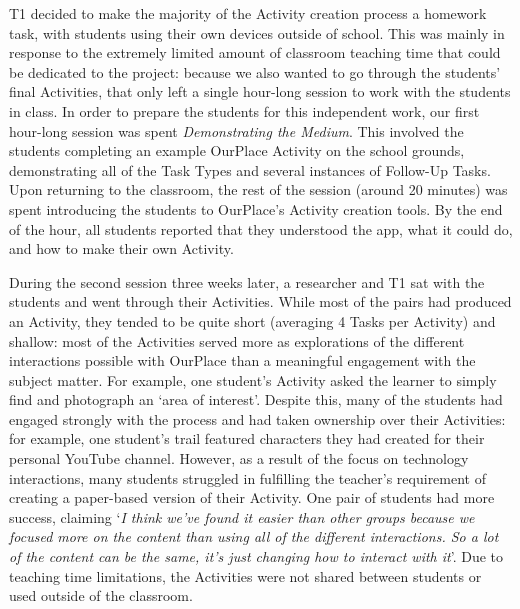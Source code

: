 T1 decided to make the majority of the Activity creation process a homework task, with students using their own devices outside of school. This was mainly in response to the extremely limited amount of classroom teaching time that could be dedicated to the project: because we also wanted to go through the students' final Activities, that only left a single hour-long session to work with the students in class. In order to prepare the students for this independent work, our first hour-long session was spent \textit{Demonstrating the Medium}. This involved the students completing an example OurPlace Activity on the school grounds, demonstrating all of the Task Types and several instances of Follow-Up Tasks. Upon returning to the classroom, the rest of the session (around 20 minutes) was spent introducing the students to OurPlace's Activity creation tools. By the end of the hour, all students reported that they understood the app, what it could do, and how to make their own Activity.

During the second session three weeks later, a researcher and T1 sat with the students and went through their Activities. While most of the pairs had produced an Activity, they tended to be quite short (averaging 4 Tasks per Activity) and shallow: most of the Activities served more as explorations of the different interactions possible with OurPlace than a meaningful engagement with the subject matter. For example, one student's Activity asked the learner to simply find and photograph an `area of interest'. Despite this, many of the students had engaged strongly with the process and had taken ownership over their Activities: for example, one student's trail featured characters they had created for their personal YouTube channel. However, as a result of the focus on technology interactions, many students struggled in fulfilling the teacher's requirement of creating a paper-based version of their Activity. One pair of students had more success, claiming `\textit{I think we've found it easier than other groups because we focused more on the content than using all of the different interactions. So a lot of the content can be the same, it's just changing how to interact with it}'. Due to teaching time limitations, the Activities were not shared between students or used outside of the classroom.

